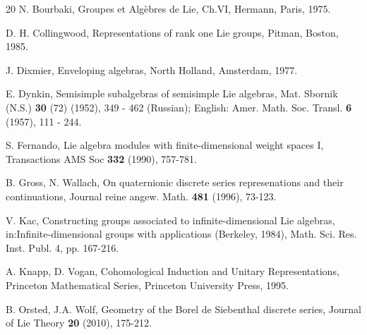 \documentclass[default]{./styles/svmult}
\begin{document}
\vspace{2cm}

\begin{thebibliography}{20}
 N. Bourbaki, Groupes et Alg\`{e}bres de Lie, Ch.VI, Hermann, Paris, 1975.

\vspace{.25cm}

 D. H. Collingwood, Representations of rank one Lie groups, Pitman, Boston, 1985.

\vspace{.25cm}

 J. Dixmier, Enveloping algebras, North Holland, Amsterdam, 1977.

\vspace{.25cm}

 E. Dynkin, Semisimple subalgebras of semisimple Lie algebras, Mat. Sbornik (N.S.) \textbf{30} (72) (1952), 349 - 462 (Russian); English: Amer. Math. Soc. Transl. \textbf{6} (1957), 111 - 244.

\vspace{.25cm}

 S. Fernando, Lie algebra modules with finite-dimensional weight spaces I, Transactions AMS Soc \textbf{332} (1990), 757-781.

\vspace{.25cm}

 B. Gross, N. Wallach, On quaternionic discrete series represenations and their continuations, Journal reine angew. Math. \textbf{481} (1996), 73-123.

\vspace{.25cm}

 V. Kac, Constructing groups associated to infinite-dimensional Lie algebras, in:Infinite-dimensional groups with applications (Berkeley, 1984), Math. Sci. Res. Inst. Publ. 4, pp. 167-216.

\vspace{.25cm}

 A. Knapp, D. Vogan, Cohomological Induction and Unitary Representations, Princeton Mathematical Series, Princeton University Press, 1995.

\vspace{.25cm}

 B. Orsted, J.A. Wolf, Geometry of the Borel de Siebenthal discrete series, Journal of Lie Theory \textbf{20} (2010), 175-212.

\vspace{.25cm}


\end{thebibliography}
\end{document}
